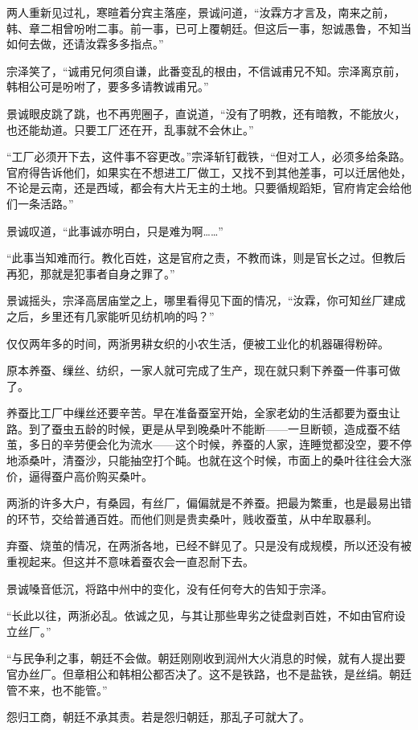 两人重新见过礼，寒暄着分宾主落座，景诚问道，“汝霖方才言及，南来之前，韩、章二相曾吩咐二事。前一事，已可上覆朝廷。但这后一事，恕诚愚鲁，不知当如何去做，还请汝霖多多指点。”

宗泽笑了，“诚甫兄何须自谦，此番变乱的根由，不信诚甫兄不知。宗泽离京前，韩相公可是吩咐了，要多多请教诚甫兄。”

景诚眼皮跳了跳，也不再兜圈子，直说道，“没有了明教，还有暗教，不能放火，也还能劫道。只要工厂还在开，乱事就不会休止。”

“工厂必须开下去，这件事不容更改。”宗泽斩钉截铁，“但对工人，必须多给条路。官府得告诉他们，如果实在不想进工厂做工，又找不到其他差事，可以迁居他处，不论是云南，还是西域，都会有大片无主的土地。只要循规蹈矩，官府肯定会给他们一条活路。”

景诚叹道，“此事诚亦明白，只是难为啊……”

“此事当知难而行。教化百姓，这是官府之责，不教而诛，则是官长之过。但教后再犯，那就是犯事者自身之罪了。”

景诚摇头，宗泽高居庙堂之上，哪里看得见下面的情况，“汝霖，你可知丝厂建成之后，乡里还有几家能听见纺机响的吗？”

仅仅两年多的时间，两浙男耕女织的小农生活，便被工业化的机器碾得粉碎。

原本养蚕、缫丝、纺织，一家人就可完成了生产，现在就只剩下养蚕一件事可做了。

养蚕比工厂中缫丝还要辛苦。早在准备蚕室开始，全家老幼的生活都要为蚕虫让路。到了蚕虫五龄的时候，更是从早到晚桑叶不能断——一旦断顿，造成蚕不结茧，多日的辛劳便会化为流水——这个时候，养蚕的人家，连睡觉都没空，要不停地添桑叶，清蚕沙，只能抽空打个盹。也就在这个时候，市面上的桑叶往往会大涨价，逼得蚕户高价购买桑叶。

两浙的许多大户，有桑园，有丝厂，偏偏就是不养蚕。把最为繁重，也是最易出错的环节，交给普通百姓。而他们则是贵卖桑叶，贱收蚕茧，从中牟取暴利。

弃蚕、烧茧的情况，在两浙各地，已经不鲜见了。只是没有成规模，所以还没有被重视起来。但这并不意味着蚕农会一直忍耐下去。

景诚嗓音低沉，将路中州中的变化，没有任何夸大的告知于宗泽。

“长此以往，两浙必乱。依诚之见，与其让那些卑劣之徒盘剥百姓，不如由官府设立丝厂。”

“与民争利之事，朝廷不会做。朝廷刚刚收到润州大火消息的时候，就有人提出要官办丝厂。但章相公和韩相公都否决了。这不是铁路，也不是盐铁，是丝绢。朝廷管不来，也不能管。”

怨归工商，朝廷不承其责。若是怨归朝廷，那乱子可就大了。

